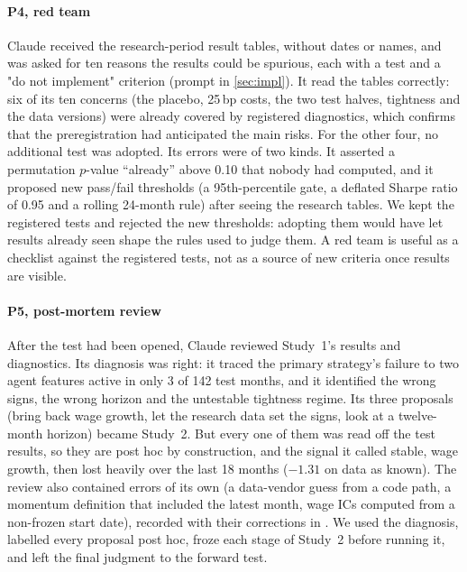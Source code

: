 \documentclass[11pt,letterpaper]{article}
\begin{document}
\paragraph{P4, red team} Claude received the research-period result tables,
without dates or names, and was asked for ten reasons the results could be
spurious, each with a test and a "do not implement" criterion (prompt in
\cref{sec:impl}). It read the tables correctly: six of its ten concerns (the
placebo, 25\,bp costs, the two test halves, tightness and the data versions)
were already covered by registered diagnostics, which confirms that the
preregistration had anticipated the main risks. For the other four, no
additional test was adopted. %
Its errors were of two kinds. It asserted a permutation $p$-value
``already'' above 0.10 that nobody had computed, and it proposed new pass/fail
thresholds (a 95th-percentile gate, a deflated Sharpe ratio of 0.95 and a
rolling 24-month rule) after seeing the research tables. We kept the registered
tests and rejected the new thresholds: adopting them would have let results
already seen shape the rules used to judge them. A red team is useful as a
checklist against the registered tests, not as a source of new criteria once
results are visible.

\paragraph{P5, post-mortem review} After the test had been opened, Claude
reviewed Study~1's results and diagnostics. Its diagnosis was right: it traced
the primary strategy's failure to two agent features active in only 3 of 142
test months, and it identified the wrong signs, the wrong horizon and the
untestable tightness regime. Its three proposals (bring back wage growth, let the
research data set the signs, look at a twelve-month horizon) became Study~2.
But every one of them was read off the test results, so they are post hoc by
construction, and the signal it called stable, wage growth, then lost heavily
over the last 18 months ($-1.31$ on data as known). The review also contained
errors of its own (a data-vendor guess from a code path, a momentum definition
that included the latest month, wage ICs computed from a non-frozen start date),
recorded with their corrections in . We used
the diagnosis, labelled every proposal post hoc, froze each stage of Study~2
before running it, and left the final judgment to the forward test.
\end{document}
